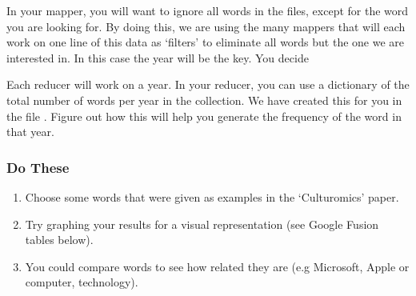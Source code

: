 \documentclass[letterpaper,10pt,openany,oneside]{sphinxmanual}
\begin{document}
In your mapper, you will want to ignore all words in the files,
except for the word you are looking for. By doing this, we are
using the many mappers that will each work on one line of this data
as `filters' to eliminate all words but the one we are interested
in. In this case the year will be the key. You decide

Each reducer will work on a year. In your reducer, you can use a
dictionary of the total number of words per year in the collection.
We have created this for you in the file .
Figure out how this will help you generate the frequency of the
word in that year.


\subsubsection{Do These}
\label{WmrActivities/WmrActivities:do-these}\begin{enumerate}
\item {} 
Choose some words that were given as examples in the
`Culturomics' paper.

\item {} 
Try graphing your results for a visual representation (see
Google Fusion tables below).

\item {} 
You could compare words to see how related they are (e.g
Microsoft, Apple or computer, technology).

\end{enumerate}
\end{document}
